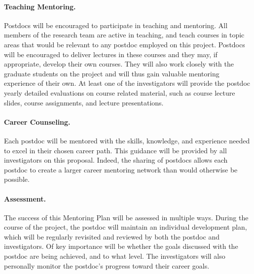 \documentclass[10pt]{SelfArx}
\begin{document}
\paragraph{Teaching Mentoring.} Postdocs will be encouraged to participate in teaching and mentoring. All members of the research team are active in teaching, and teach courses in topic areas that would be relevant to any postdoc employed on this project. Postdocs will be encouraged to deliver lectures in these courses and they may, if appropriate, develop their own courses. They will also work closely with the graduate students on the project and will thus gain valuable mentoring experience of their own.  At least one of the investigators will provide the postdoc yearly detailed evaluations on course related material, such as course lecture slides, course assignments, and lecture presentations.

\paragraph{Career Counseling.} Each postdoc will be mentored with the skills, knowledge, and experience needed to excel in their chosen career path. This guidance will be provided by all investigators on this proposal.  Indeed, the sharing of postdocs allows each postdoc to create a larger career mentoring network than would otherwise be possible.

\paragraph{Assessment.} The success of this Mentoring Plan will be assessed in multiple ways.  During the course of the project, the postdoc will maintain an individual development plan, which will be regularly revisited and reviewed by both the postdoc and investigators.  Of key importance will be whether the goals discussed with the postdoc are being achieved, and to what level. The investigators will also personally monitor the postdoc's progress toward their career goals.
\end{document}
